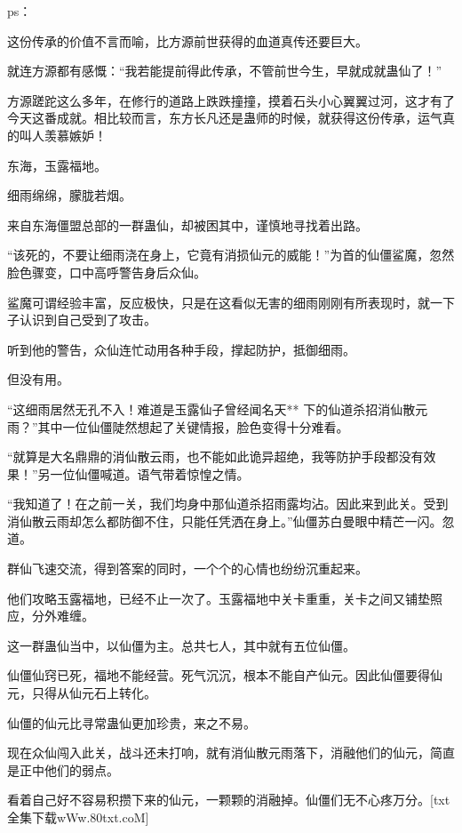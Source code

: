 
\begin{this_body}

ps：

这份传承的价值不言而喻，比方源前世获得的血道真传还要巨大。

就连方源都有感慨：“我若能提前得此传承，不管前世今生，早就成就蛊仙了！”

方源蹉跎这么多年，在修行的道路上跌跌撞撞，摸着石头小心翼翼过河，这才有了今天这番成就。相比较而言，东方长凡还是蛊师的时候，就获得这份传承，运气真的叫人羡慕嫉妒！

东海，玉露福地。

细雨绵绵，朦胧若烟。

来自东海僵盟总部的一群蛊仙，却被困其中，谨慎地寻找着出路。

“该死的，不要让细雨浇在身上，它竟有消损仙元的威能！”为首的仙僵鲨魔，忽然脸色骤变，口中高呼警告身后众仙。

鲨魔可谓经验丰富，反应极快，只是在这看似无害的细雨刚刚有所表现时，就一下子认识到自己受到了攻击。

听到他的警告，众仙连忙动用各种手段，撑起防护，抵御细雨。

但没有用。

“这细雨居然无孔不入！难道是玉露仙子曾经闻名天** 下的仙道杀招消仙散元雨？”其中一位仙僵陡然想起了关键情报，脸色变得十分难看。

“就算是大名鼎鼎的消仙散云雨，也不能如此诡异超绝，我等防护手段都没有效果！”另一位仙僵喊道。语气带着惊惶之情。

“我知道了！在之前一关，我们均身中那仙道杀招雨露均沾。因此来到此关。受到消仙散云雨却怎么都防御不住，只能任凭洒在身上。”仙僵苏白曼眼中精芒一闪。忽道。

群仙飞速交流，得到答案的同时，一个个的心情也纷纷沉重起来。

他们攻略玉露福地，已经不止一次了。玉露福地中关卡重重，关卡之间又铺垫照应，分外难缠。

这一群蛊仙当中，以仙僵为主。总共七人，其中就有五位仙僵。

仙僵仙窍已死，福地不能经营。死气沉沉，根本不能自产仙元。因此仙僵要得仙元，只得从仙元石上转化。

仙僵的仙元比寻常蛊仙更加珍贵，来之不易。

现在众仙闯入此关，战斗还未打响，就有消仙散元雨落下，消融他们的仙元，简直是正中他们的弱点。

看着自己好不容易积攒下来的仙元，一颗颗的消融掉。仙僵们无不心疼万分。[txt全集下载wWw.80txt.coM]


\end{this_body}
